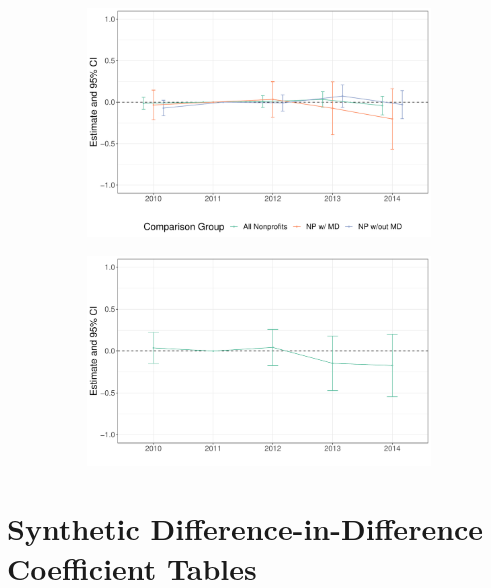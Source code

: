 \documentclass[12pt]{article}
\begin{document}
\begin{figure}[ht!]
     \vspace{5mm}
     \hfill
     \begin{subfigure}[b]{0.45\textwidth}
         \centering
         \caption{}
         \includegraphics[width=\textwidth]{Objects/mort_forprofit_es_graph.pdf}
         \label{fig:es_plotc}
     \end{subfigure}
     \hfill
     \begin{subfigure}[b]{0.45\textwidth}
         \centering
         \caption{}
         \includegraphics[width=\textwidth]{Objects/mort_MD_es_graph.pdf}
         \label{fig:es_plotd}
     \end{subfigure}
        \label{fig:es_plot}
    \end{figure}




\section{Synthetic Difference-in-Difference Coefficient Tables}
\end{document}
